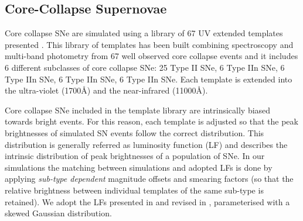 \documentclass[a4paper,fleqn,usenatbib]{mnras}
\begin{document}
\subsection{Core-Collapse Supernovae}

Core collapse SNe are simulated using a library of 67 UV extended templates presented \cite{Vincenzi2019}. This library of templates has been built combining spectroscopy and multi-band photometry from 67 well observed core collapse events and it includes 6 different subclasses of core collapse SNe: 25 Type II SNe, 6 Type IIn SNe, 6 Type IIn SNe, 6 Type IIn SNe, 6 Type IIn SNe.
Each template is extended into the ultra-violet (1700\AA) and the near-infrared (11000\AA).%

Core collapse SNe included in the template library are intrinsically biased towards bright events. For this reason, each template is adjusted so that the peak brightnesses of simulated SN events follow the correct distribution. This distribution is generally referred as luminosity function (LF) and describes the intrinsic distribution of peak brightnesses of a population of SNe. 
In our simulations the matching between simulations and adopted LFs is done by applying \textit{sub-type dependent} magnitude offsets and smearing factors (so that the relative brightness between individual templates of the same sub-type is retained).
We adopt the LFs presented in \cite{2011MNRAS.412.1441L} and revised in \cite{Vincenzi2019}, parameterised with a skewed Gaussian distribution. 
\end{document}
